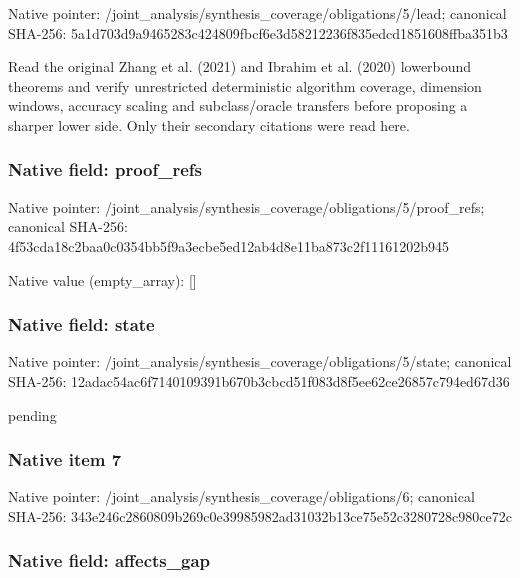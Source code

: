 \documentclass[10pt,a4paper]{article}
\begin{document}
Native pointer: /joint\_analysis/synthesi\allowbreak{}s\_coverage/obligations/5\allowbreak{}/lead; canonical SHA-256: 5a1d703d9a9465283c424809\allowbreak{}fbcf6e3d58212236f835edcd\allowbreak{}1851608ffba351b3


Read the original Zhang et al. (2021) and Ibrahim et al. (2020) lowerbound theorems and verify unrestricted deterministic algorithm coverage, dimension windows, accuracy scaling and subclass/oracle transfers before proposing a sharper lower side. Only their secondary citations were read here.


\subsubsection{Native field: proof\_refs}


Native pointer: /joint\_analysis/synthesi\allowbreak{}s\_coverage/obligations/5\allowbreak{}/proof\_refs; canonical SHA-256: 4f53cda18c2baa0c0354bb5f\allowbreak{}9a3ecbe5ed12ab4d8e11ba87\allowbreak{}3c2f11161202b945



Native value (empty\_array): []



\subsubsection{Native field: state}


Native pointer: /joint\_analysis/synthesi\allowbreak{}s\_coverage/obligations/5\allowbreak{}/state; canonical SHA-256: 12adac54ac6f7140109391b6\allowbreak{}70b3cbcd51f083d8f5ee62ce\allowbreak{}26857c794ed67d36


pending


\subsubsection{Native item 7}


Native pointer: /joint\_analysis/synthesi\allowbreak{}s\_coverage/obligations/6; canonical SHA-256: 343e246c2860809b269c0e39\allowbreak{}985982ad31032b13ce75e52c\allowbreak{}3280728c980ce72c



\subsubsection{Native field: affects\_gap}
\end{document}
